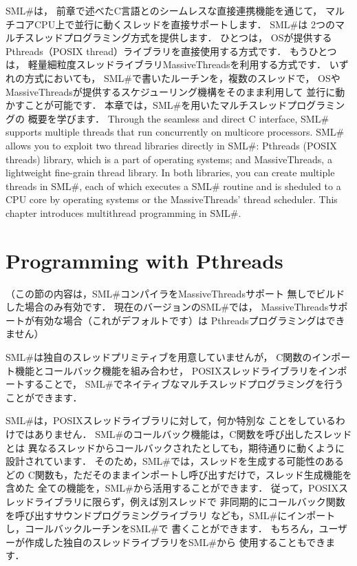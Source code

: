\documentclass{jbook}
\newcommand{\txt}[2]{#2}
\newcommand{\smlsharp}{SML\#}
\begin{document}
\ifjp%
	\smlsharp{}は，
前章で述べたC言語とのシームレスな直接連携機能を通じて，
マルチコアCPU上で並行に動くスレッドを直接サポートします．
	\smlsharp{}は
2つのマルチスレッドプログラミング方式を提供します．
	ひとつは，
OSが提供するPthreads（POSIX thread）ライブラリを直接使用する方式です．
	もうひとつは，
軽量細粒度スレッドライブラリMassiveThreadsを利用する方式です．
	いずれの方式においても，
\smlsharp{}で書いたルーチンを，複数のスレッドで，
OSやMassiveThreadsが提供するスケジューリング機構をそのまま利用して
並行に動かすことが可能です．
	本章では，\smlsharp{}を用いたマルチスレッドプログラミングの
概要を学びます．
\else%
	Through the seamless and direct C interface,
\smlsharp{} supports multiple threads that run concurrently on
multicore processors.
	\smlsharp{} allows you to exploit
two thread libraries directly in \smlsharp{}:
Pthreads (POSIX threads) library, which is a part of operating systems;
and MassiveThreads, a lightweight fine-grain thread library.
	In both libraries,
you can create multiple threads in \smlsharp{}, each of which
executes a \smlsharp{} routine and is sheduled to a CPU core
by operating systems or the MassiveThreads' thread scheduler.
	This chapter introduces multithread programming in \smlsharp{}.
\fi%


\section{\txt{Pthreadsプログラミング}
{Programming with Pthreads}}

\ifjp%
	（この節の内容は，\smlsharp{}コンパイラをMassiveThreadsサポート
無しでビルドした場合のみ有効です．
	現在のバージョンの\smlsharp{}では，
MassiveThreadsサポートが有効な場合（これがデフォルトです）は
Pthreadsプログラミングはできません）

	\smlsharp{}は独自のスレッドプリミティブを用意していませんが，
C関数のインポート機能とコールバック機能を組み合わせ，
POSIXスレッドライブラリをインポートすることで，
\smlsharp{}でネイティブなマルチスレッドプログラミングを行うことができます．

	\smlsharp{}は，POSIXスレッドライブラリに対して，何か特別な
ことをしているわけではありません．
	\smlsharp{}のコールバック機能は，C関数を呼び出したスレッドとは
異なるスレッドからコールバックされたとしても，期待通りに動くように
設計されています．
	そのため，\smlsharp{}では，スレッドを生成する可能性のあるどの
C関数も，ただそのままインポートし呼び出すだけで，スレッド生成機能を含めた
全ての機能を，\smlsharp{}から活用することができます．
	従って，POSIXスレッドライブラリに限らず，例えば別スレッドで
非同期的にコールバック関数を呼び出すサウンドプログラミングライブラリ
なども，\smlsharp{}にインポートし，コールバックルーチンを\smlsharp{}で
書くことができます．
	もちろん，ユーザーが作成した独自のスレッドライブラリを\smlsharp{}から
使用することもできます．
\end{document}
